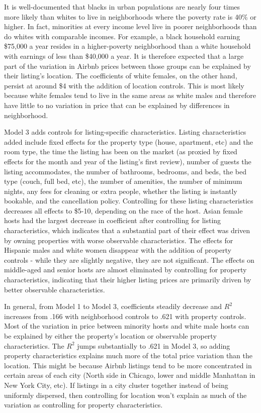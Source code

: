 It is well-documented that blacks in urban populations are nearly four times more likely than whites to live in neighborhoods where the poverty rate is 40\% or higher.\cite{firebaugh} In fact, minorities at every income level live in poorer neighborhoods than do whites with comparable incomes. For example, a black household earning \$75,000 a year resides in a higher-poverty neighborhood than a white household with earnings of less than \$40,000 a year.\cite{logan} It is therefore expected that a large part of the variation in Airbnb prices between those groups can be explained by their listing's location. The coefficients of white females, on the other hand, persist at around \$4 with the addition of location controls. This is most likely because white females tend to live in the same areas as white males and therefore have little to no variation in price that can be explained by differences in neighborhood.  

Model 3 adds controls for listing-specific characteristics. Listing characteristics added include fixed effects for the property type (house, apartment, etc) and the room type, the time the listing has been on the market (as proxied by fixed effects for the month and year of the listing's first review), number of guests the listing accommodates, the number of bathrooms, bedrooms, and beds, the bed type (couch, full bed, etc), the number of amenities, the number of minimum nights, any fees for cleaning or extra people, whether the listing is instantly bookable, and the cancellation policy. Controlling for these listing characteristics decreases all effects to \$5-10, depending on the race of the host. Asian female hosts had the largest decrease in coefficient after controlling for listing characteristics, which indicates that a substantial part of their effect was driven by owning properties with worse observable characteristics. The effects for Hispanic males and white women disappear with the addition of property controls - while they are slightly negative, they are not significant. The effects on middle-aged and senior hosts are almost eliminated by controlling for property characteristics, indicating that their higher listing prices are primarily driven by better observable characteristics. 

In general, from Model 1 to Model 3, coefficients steadily decrease and $R^2$ increases from .166 with neighborhood controls to .621 with property controls. Most of the variation in price between minority hosts and white male hosts can be explained by either the property's location or observable property characteristics. The $R^2$ jumps substantially to .621 in Model 3, so adding property characteristics explains much more of the total price variation than the location. This might be because Airbnb listings tend to be more concentrated in certain areas of each city (North side in Chicago, lower and middle Manhattan in New York City, etc). If listings in a city cluster together instead of being uniformly dispersed, then controlling for location won't explain as much of the variation as controlling for property characteristics.   

